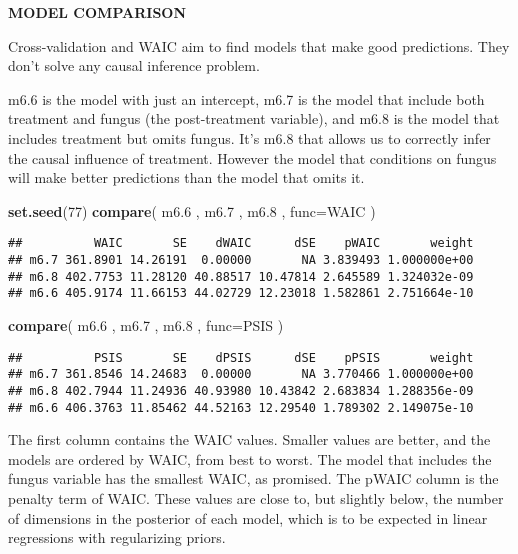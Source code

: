 \documentclass[
]{article}
\newenvironment{Shaded}{\begin{snugshade}}{\end{snugshade}}
\newcommand{\DataTypeTok}[1]{\textcolor[rgb]{0.13,0.29,0.53}{#1}}
\newcommand{\DecValTok}[1]{\textcolor[rgb]{0.00,0.00,0.81}{#1}}
\newcommand{\FloatTok}[1]{\textcolor[rgb]{0.00,0.00,0.81}{#1}}
\newcommand{\KeywordTok}[1]{\textcolor[rgb]{0.13,0.29,0.53}{\textbf{#1}}}
\newcommand{\NormalTok}[1]{#1}
\begin{document}
\textbf{MODEL COMPARISON}

Cross-validation and WAIC aim to find models that make good predictions.
They don't solve any causal inference problem.

m6.6 is the model with just an intercept, m6.7 is the model that include
both treatment and fungus (the post-treatment variable), and m6.8 is the
model that includes treatment but omits fungus. It's m6.8 that allows us
to correctly infer the causal influence of treatment. However the model
that conditions on fungus will make better predictions than the model
that omits it.

\begin{Shaded}
\begin{Highlighting}[]
\KeywordTok{set.seed}\NormalTok{(}\DecValTok{77}\NormalTok{)}
\KeywordTok{compare}\NormalTok{( m6}\FloatTok{.6}\NormalTok{ , m6}\FloatTok{.7}\NormalTok{ , m6}\FloatTok{.8}\NormalTok{ , }\DataTypeTok{func=}\NormalTok{WAIC )}
\end{Highlighting}
\end{Shaded}

\begin{verbatim}
##          WAIC       SE    dWAIC      dSE    pWAIC       weight
## m6.7 361.8901 14.26191  0.00000       NA 3.839493 1.000000e+00
## m6.8 402.7753 11.28120 40.88517 10.47814 2.645589 1.324032e-09
## m6.6 405.9174 11.66153 44.02729 12.23018 1.582861 2.751664e-10
\end{verbatim}

\begin{Shaded}
\begin{Highlighting}[]
\KeywordTok{compare}\NormalTok{( m6}\FloatTok{.6}\NormalTok{ , m6}\FloatTok{.7}\NormalTok{ , m6}\FloatTok{.8}\NormalTok{ , }\DataTypeTok{func=}\NormalTok{PSIS )}
\end{Highlighting}
\end{Shaded}

\begin{verbatim}
##          PSIS       SE    dPSIS      dSE    pPSIS       weight
## m6.7 361.8546 14.24683  0.00000       NA 3.770466 1.000000e+00
## m6.8 402.7944 11.24936 40.93980 10.43842 2.683834 1.288356e-09
## m6.6 406.3763 11.85462 44.52163 12.29540 1.789302 2.149075e-10
\end{verbatim}

The first column contains the WAIC values. Smaller values are better,
and the models are ordered by WAIC, from best to worst. The model that
includes the fungus variable has the smallest WAIC, as promised. The
pWAIC column is the penalty term of WAIC. These values are close to, but
slightly below, the number of dimensions in the posterior of each model,
which is to be expected in linear regressions with regularizing priors.
\end{document}
